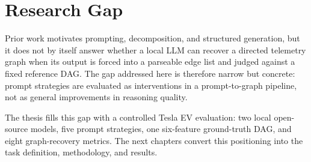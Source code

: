 \section{Research Gap}

Prior work motivates prompting, decomposition, and structured generation, but
it does not by itself answer whether a local LLM can recover a directed
telemetry graph when its output is forced into a parseable edge list and
judged against a fixed reference DAG. The gap addressed here is therefore
narrow but concrete: prompt strategies are evaluated as interventions in a
prompt-to-graph pipeline, not as general improvements in reasoning quality.

The thesis fills this gap with a controlled Tesla EV evaluation: two local
open-source models, five prompt strategies, one six-feature ground-truth DAG,
and eight graph-recovery metrics. The next chapters convert this positioning
into the task definition, methodology, and results.
